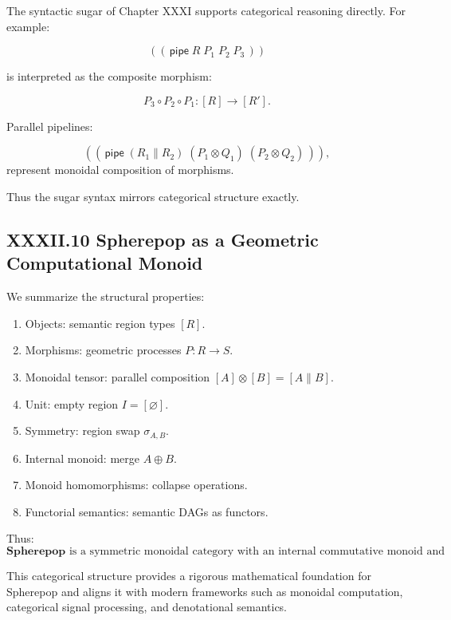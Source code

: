 \documentclass[11pt,letterpaper]{article}
\begin{document}
The syntactic sugar of Chapter XXXI supports categorical reasoning directly. For example:

\[
((\,\mathsf{pipe}\; R\; P_1\; P_2\; P_3\,))
\]

is interpreted as the composite morphism:

\[
P_3 \circ P_2 \circ P_1 : [R] \to [R'].
\]

Parallel pipelines:

\[
((\,\mathsf{pipe}\; (R_1 \parallel R_2)\; (P_1 \otimes Q_1)\; (P_2 \otimes Q_2)\,)),
\]
represent monoidal composition of morphisms.

Thus the sugar syntax mirrors categorical structure exactly.

\subsection{XXXII.10 Spherepop as a Geometric Computational Monoid}

We summarize the structural properties:

\begin{enumerate}
    \item Objects: semantic region types $[R]$.
    \item Morphisms: geometric processes $P : R \to S$.
    \item Monoidal tensor: parallel composition $[A] \otimes [B] = [A \parallel B]$.
    \item Unit: empty region $I = [\varnothing]$.
    \item Symmetry: region swap $\sigma_{A,B}$.
    \item Internal monoid: merge $A \oplus B$.
    \item Monoid homomorphisms: collapse operations.
    \item Functorial semantics: semantic DAGs as functors.
\end{enumerate}

Thus:
\[
\boxed{
\mathbf{Spherepop} \text{ is a symmetric monoidal category with an internal commutative monoid and collapse homomorphisms.}
}
\]

This categorical structure provides a rigorous mathematical foundation for Spherepop and aligns it with modern frameworks such as monoidal computation, categorical signal processing, and denotational semantics.

\end{document}
